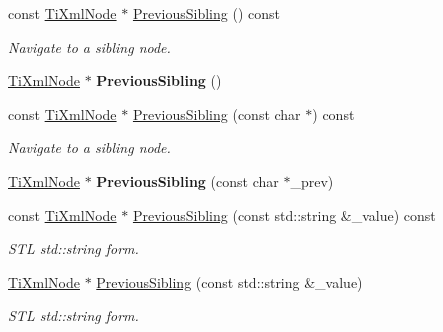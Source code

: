 \begin{DoxyCompactItemize}
const \hyperlink{class_ti_xml_node}{Ti\+Xml\+Node} $\ast$ \hyperlink{class_ti_xml_node_a8aacf06b1a577ff0d7cfa502cc76da32}{Previous\+Sibling} () const
\begin{DoxyCompactList}\small\item\em Navigate to a sibling node. \end{DoxyCompactList}\item 
\hypertarget{class_ti_xml_node_af8c0642ad6ecc03f62953e68896ed1cc}{}\label{class_ti_xml_node_af8c0642ad6ecc03f62953e68896ed1cc} 
\hyperlink{class_ti_xml_node}{Ti\+Xml\+Node} $\ast$ {\bfseries Previous\+Sibling} ()
\item 
\hypertarget{class_ti_xml_node_ace1b618fe58b2b9305fe89bfbc8dd17b}{}\label{class_ti_xml_node_ace1b618fe58b2b9305fe89bfbc8dd17b} 
const \hyperlink{class_ti_xml_node}{Ti\+Xml\+Node} $\ast$ \hyperlink{class_ti_xml_node_ace1b618fe58b2b9305fe89bfbc8dd17b}{Previous\+Sibling} (const char $\ast$) const
\begin{DoxyCompactList}\small\item\em Navigate to a sibling node. \end{DoxyCompactList}\item 
\hypertarget{class_ti_xml_node_a6c977049207177ef21b51972315c2053}{}\label{class_ti_xml_node_a6c977049207177ef21b51972315c2053} 
\hyperlink{class_ti_xml_node}{Ti\+Xml\+Node} $\ast$ {\bfseries Previous\+Sibling} (const char $\ast$\+\_\+prev)
\item 
\hypertarget{class_ti_xml_node_a64ee1c722b607040cd02bd0fd05eb04a}{}\label{class_ti_xml_node_a64ee1c722b607040cd02bd0fd05eb04a} 
const \hyperlink{class_ti_xml_node}{Ti\+Xml\+Node} $\ast$ \hyperlink{class_ti_xml_node_a64ee1c722b607040cd02bd0fd05eb04a}{Previous\+Sibling} (const std\+::string \&\+\_\+value) const
\begin{DoxyCompactList}\small\item\em S\+TL std\+::string form. \end{DoxyCompactList}\item 
\hypertarget{class_ti_xml_node_acc8a0434c7f401d4a3b6dee77c1a5912}{}\label{class_ti_xml_node_acc8a0434c7f401d4a3b6dee77c1a5912} 
\hyperlink{class_ti_xml_node}{Ti\+Xml\+Node} $\ast$ \hyperlink{class_ti_xml_node_acc8a0434c7f401d4a3b6dee77c1a5912}{Previous\+Sibling} (const std\+::string \&\+\_\+value)
\begin{DoxyCompactList}\small\item\em S\+TL std\+::string form. \end{DoxyCompactList}\item 

\end{DoxyCompactItemize}
